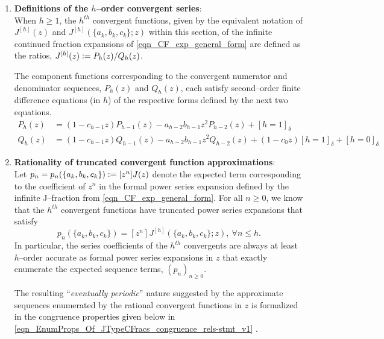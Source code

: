 \documentclass[12pt,reqno]{article}
\numberwithin{sfootnote}{section}
\numberwithin{equation}{section}
\newcommand{\itemlabel}[1]{\textbf{#1}: \\ }
\theoremstyle{plain}
\theoremstyle{definition}
\theoremstyle{remark}
\newcommand{\quotetext}[1]{``#1''}
\newcommand{\defequals}{\ensuremath{\vcentcolon=}}
\newcommand{\Iverson}[1]{\ensuremath{\left[#1\right]_{\delta}}}
\begin{document}
\begin{enumerate} 
     \setlength{\itemsep}{-1mm} 

\item \itemlabel{Definitions of the $h$--order convergent series} 
When $h \geq 1$, the $h^{th}$ convergent functions, 
given by the equivalent notation of 
$J^{[h]}(z)$ and $J^{[h]}(\{a_k, b_k, c_k\}; z)$ within this section, 
of the infinite continued fraction expansions of 
\eqref{eqn_CF_exp_general_form} 
are defined as the ratios, $J^{[h]}(z) \defequals P_h(z) / Q_h(z)$. 

The component functions corresponding to the convergent 
numerator and denominator sequences, $P_h(z)$ and $Q_h(z)$, 
each satisfy second--order 
finite difference equations (in $h$) of the respective forms 
defined by the next two equations. 
\begin{align*} 
P_h(z) & = (1-c_{h-1} z) P_{h-1}(z)-a_{h-2}b_{h-1} z^2 P_{h-2}(z) + 
           \Iverson{h = 1} \\ 
Q_h(z) & = (1-c_{h-1} z) Q_{h-1}(z)-a_{h-2}b_{h-1} z^2 Q_{h-2}(z) + 
           (1-c_0 z) \Iverson{h = 1}+\Iverson{h=0} 
\end{align*} 

\item \itemlabel{Rationality of truncated convergent function approximations} 
Let $p_n = p_n(\{a_k, b_k, c_k\}) \defequals [z^n] J(z)$ 
denote the expected term corresponding to the coefficient of $z^n$ in the 
formal power series expansion defined by the infinite J--fraction from 
\eqref{eqn_CF_exp_general_form}. 
For all $n \geq 0$, we know that the $h^{th}$ convergent functions 
have truncated power series expansions that satisfy 
\begin{equation*} 
p_n(\{a_k, b_k, c_k\}) = [z^n] J^{[h]}(\{a_k, b_k, c_k\}; z),\ 
     \forall n \leq h. 
\end{equation*} 
In particular, the series coefficients of the $h^{th}$ convergents are 
always at least $h$--order accurate as formal power series 
expansions in $z$ that exactly enumerate the expected sequence terms, 
$\left(p_n\right)_{n \geq 0}$. 

The resulting \quotetext{\emph{eventually periodic}} nature 
suggested by the approximate sequences enumerated by 
the rational convergent functions in $z$ is formalized in the 
congruence properties given below in 
\eqref{eqn_EnumProps_Of_JTypeCFracs_congruence_rels-stmt_v1} 
\citep{FLAJOLET82} \citep[See \S 2, \S 5.7]{GFLECT}. 


\end{enumerate}
\end{document}
